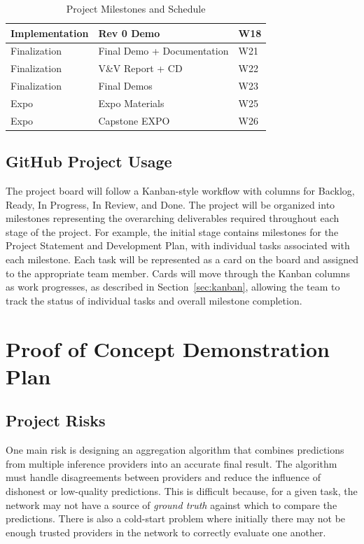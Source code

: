\documentclass{article}
\begin{document}
\begin{table}[ht]
\begin{tabularx}{\textwidth}{|>{\centering\arraybackslash}p{3cm}|
                                    X|
                                    >{\centering\arraybackslash}p{2cm}|}
        Implementation & Rev 0 Demo & W18 \\
        \hline
        
        Finalization & Final Demo + Documentation & W21 \\
        \hline
        
        Finalization & V\&V Report + CD & W22 \\
        \hline
        
        Finalization & Final Demos & W23 \\
        \hline
        
        Expo & Expo Materials & W25 \\
        \hline
        
        Expo & Capstone EXPO & W26 \\
        \hline
    \end{tabularx}
    
    \caption{Project Milestones and Schedule}
    \label{tab:milestones}
\end{table}

\subsection{GitHub Project Usage}
The project board will follow a Kanban-style workflow with columns for Backlog,
Ready, In Progress, In Review, and Done. The project will be organized into 
milestones representing the overarching deliverables required throughout each 
stage of the project. For example, the initial stage contains milestones for 
the Project Statement and Development Plan, with individual tasks associated 
with each milestone. Each task will be represented as a card on the board and 
assigned to the appropriate team member. Cards will move through the Kanban columns 
as work progresses, as described in Section~\ref{sec:kanban}, allowing the team to track the status of individual tasks and overall 
milestone completion.

\section{Proof of Concept Demonstration Plan}

\subsection{Project Risks}

One main risk is designing an aggregation algorithm that combines predictions
from multiple inference providers into an accurate final result. The algorithm
must handle disagreements between providers and reduce the influence of
dishonest or low-quality predictions. This is difficult because, for a given
task, the network may not have a source of \textit{ground truth} against which
to compare the predictions. There is also a cold-start problem where initially
there may not be enough trusted providers in the network to correctly evaluate
one another. 
\end{document}
